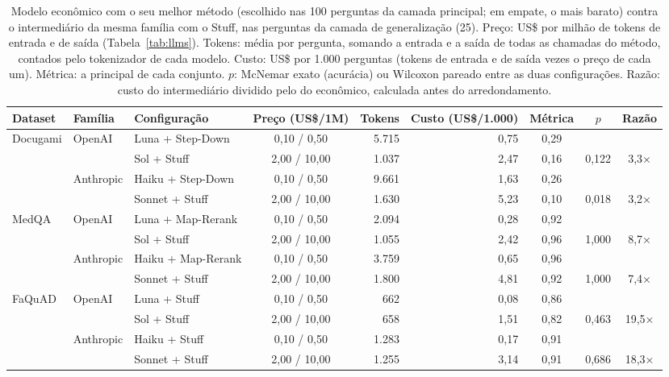 \begin{table}[!t]
\centering
\footnotesize
\setlength{\tabcolsep}{4pt}
\caption{Modelo econômico com o seu melhor método (escolhido nas 100 perguntas da camada principal; em empate, o mais barato) contra o intermediário da mesma família com o Stuff, nas perguntas da camada de generalização (25). Preço: US\$ por milhão de tokens de entrada e de saída (Tabela~\ref{tab:llms}). Tokens: média por pergunta, somando a entrada e a saída de todas as chamadas do método, contados pelo tokenizador de cada modelo. Custo: US\$ por 1.000 perguntas (tokens de entrada e de saída vezes o preço de cada um). Métrica: a principal de cada conjunto. $p$: McNemar exato (acurácia) ou Wilcoxon pareado entre as duas configurações. Razão: custo do intermediário dividido pelo do econômico, calculada antes do arredondamento.}
\label{tab:porte}
\begin{tabular}{lllcrrccc}
\toprule
Dataset & Família & Configuração & Preço (US\$/1M) & Tokens & Custo (US\$/1.000) & Métrica & $p$ & Razão \\
\midrule
Docugami & OpenAI & Luna + Step-Down & 0,10 / 0,50 & 5.715 & 0,75 & 0,29 &  &  \\
 &  & Sol + Stuff & 2,00 / 10,00 & 1.037 & 2,47 & 0,16 & 0,122 & 3,3× \\
\addlinespace
 & Anthropic & Haiku + Step-Down & 0,10 / 0,50 & 9.661 & 1,63 & 0,26 &  &  \\
 &  & Sonnet + Stuff & 2,00 / 10,00 & 1.630 & 5,23 & 0,10 & 0,018 & 3,2× \\
\midrule
MedQA & OpenAI & Luna + Map-Rerank & 0,10 / 0,50 & 2.094 & 0,28 & 0,92 &  &  \\
 &  & Sol + Stuff & 2,00 / 10,00 & 1.055 & 2,42 & 0,96 & 1,000 & 8,7× \\
\addlinespace
 & Anthropic & Haiku + Map-Rerank & 0,10 / 0,50 & 3.759 & 0,65 & 0,96 &  &  \\
 &  & Sonnet + Stuff & 2,00 / 10,00 & 1.800 & 4,81 & 0,92 & 1,000 & 7,4× \\
\midrule
FaQuAD & OpenAI & Luna + Stuff & 0,10 / 0,50 & 662 & 0,08 & 0,86 &  &  \\
 &  & Sol + Stuff & 2,00 / 10,00 & 658 & 1,51 & 0,82 & 0,463 & 19,5× \\
\addlinespace
 & Anthropic & Haiku + Stuff & 0,10 / 0,50 & 1.283 & 0,17 & 0,91 &  &  \\
 &  & Sonnet + Stuff & 2,00 / 10,00 & 1.255 & 3,14 & 0,91 & 0,686 & 18,3× \\
\bottomrule
\end{tabular}
\end{table}
